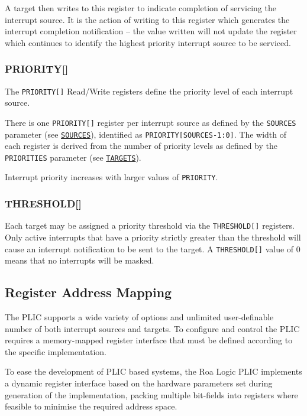 A target then writes to this register to indicate completion of
servicing the interrupt source. It is the action of writing to this
register which generates the interrupt completion notification -- the
value written will not update the register which continues to identify
the highest priority interrupt source to be serviced.

\subsubsection{PRIORITY[]}

The \texttt{PRIORITY[]} Read/Write registers define the priority level of each interrupt source.

There is one \texttt{PRIORITY[]} register per interrupt source as defined by the \texttt{SOURCES} parameter (see \protect\hyperlink{SOURCES}{\texttt{SOURCES}}), identified as \texttt{PRIORITY[SOURCES-1:0]}. The width of each register is derived from the number of priority levels as defined by the \texttt{PRIORITIES} parameter (see \protect\hyperlink{TARGETS}{\texttt{TARGETS}}).

Interrupt priority increases with larger values of \texttt{PRIORITY}.

\subsubsection{THRESHOLD[]}

Each target may be assigned a priority threshold via the
\texttt{THRESHOLD[]} registers. Only
active interrupts that have a priority strictly greater than the
threshold will cause an interrupt notification to be sent to the target.
A \texttt{THRESHOLD[]} value of 0
means that no interrupts will be masked.

\subsection{Register Address Mapping}

The PLIC supports a wide variety of options and unlimited user-definable
number of both interrupt sources and targets. To configure and control
the PLIC requires a memory-mapped register interface that must be
defined according to the specific implementation.

To ease the development of PLIC based systems, the Roa Logic PLIC
implements a dynamic register interface based on the hardware parameters
set during generation of the implementation, packing multiple bit-fields
into registers where feasible to minimise the required address space.

